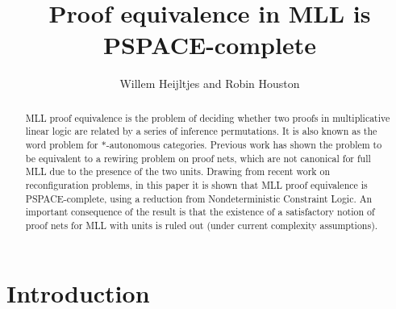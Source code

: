\documentclass{lmcs}
\title{Proof equivalence in MLL is PSPACE-complete}
\author{Willem Heijltjes and Robin Houston}
\let\capsabbrev=\uppercase
\begin{document}



\begin{abstract}
\capsabbrev{mll} proof equivalence is the problem of deciding whether two proofs in multiplicative linear logic are related by a series of inference permutations.
%
It is also known as the word problem for $*$-autonomous categories.
%
Previous work has shown the problem to be equivalent to a rewiring problem on proof nets, which are not canonical for full \capsabbrev{mll} due to the presence of the two units.
%
Drawing from recent work on reconfiguration problems, in this paper it is shown that \capsabbrev{mll} proof equivalence is \capsabbrev{pspace}-complete, using a reduction from Nondeterministic Constraint Logic.
%
An important consequence of the result is that the existence of a satisfactory notion of proof nets for \capsabbrev{mll} with units is ruled out (under current complexity assumptions).
\end{abstract}


\maketitle



\section{Introduction}


%

\cite{Lambek-1968}

\cite{Girard-1987,Danos-Regnier-1989}
\cite{Trimble-1994,Blute-Cockett-Seely-Trimble-1996}
\cite{Koh-Ong-1999}
\cite{Lamarche-Strassburger-2006}
\cite{Hughes-2012-categories,Hughes-2012-nets}


\cite{Hughes-vanGlabbeek-2005}
\cite{Heijltjes-2011}

\cite{Demaine-Hearn-2008}
\end{document}

